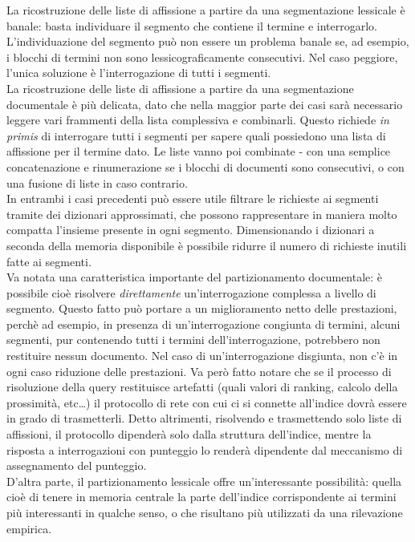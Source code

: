 La ricostruzione delle liste di affissione a partire da una segmentazione lessicale è banale: basta individuare il segmento che contiene il termine e interrogarlo. L'individuazione del segmento può non essere un problema banale se, ad esempio, i blocchi di termini non sono lessicograficamente consecutivi. Nel caso peggiore, l'unica soluzione è l'interrogazione di tutti i segmenti.\\
La ricostruzione delle liste di affissione a partire da una segmentazione documentale è più delicata, dato che nella maggior parte dei casi sarà necessario leggere vari frammenti della lista complessiva e combinarli. Questo richiede \textit{in primis} di interrogare tutti i segmenti per sapere quali possiedono una lista di affissione per il termine dato. Le liste vanno poi combinate - con una semplice concatenazione e rinumerazione se i blocchi di documenti sono consecutivi, o con una fusione di liste in caso contrario.\\
In entrambi i casi precedenti può essere utile filtrare le richieste ai segmenti tramite dei dizionari approssimati, che possono rappresentare in maniera molto compatta l'insieme presente in ogni segmento. Dimensionando i dizionari a seconda della memoria disponibile è possibile ridurre il numero di richieste inutili fatte ai segmenti.\\
Va notata una caratteristica importante del partizionamento documentale: è possibile cioè risolvere \textit{direttamente} un'interrogazione complessa a livello di segmento. Questo fatto può portare a un miglioramento netto delle prestazioni, perchè ad esempio, in presenza di un'interrogazione congiunta di termini, alcuni segmenti, pur contenendo tutti i termini dell'interrogazione, potrebbero non restituire nessun documento. Nel caso di un'interrogazione disgiunta, non c'è in ogni caso riduzione delle prestazioni. Va però fatto notare che se il processo di risoluzione della query restituisce artefatti (quali valori di ranking, calcolo della prossimità, etc\dots) il protocollo di rete con cui ci si connette all'indice dovrà essere in grado di trasmetterli. Detto altrimenti, risolvendo e trasmettendo solo liste di affissioni, il protocollo dipenderà solo dalla struttura dell'indice, mentre la risposta a interrogazioni con punteggio lo renderà dipendente dal meccanismo di assegnamento del punteggio.\\
D'altra parte, il partizionamento lessicale offre un'interessante possibilità: quella cioè di tenere in memoria centrale la parte dell'indice corrispondente ai termini più interessanti in qualche senso, o che risultano più utilizzati da una rilevazione empirica.